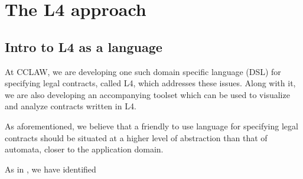 \documentclass{article}
\begin{document}

\section{The L4 approach}

\subsection{Intro to L4 as a language}
At CCLAW, we are developing one such domain specific language (DSL) for
specifying legal contracts, called L4, which addresses these issues.
Along with it, we are also developing an accompanying toolset which can be used
to visualize and analyze contracts written in L4.


As aforementioned, we believe that a friendly to use language for specifying
legal contracts should be situated at a higher level of abstraction than that
of automata, closer to the application domain.

As in \cite{normative_diags_diogo}, we have identified
\end{document}

